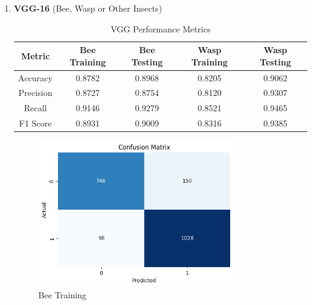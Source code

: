 \documentclass[12pt]{article}
\begin{document}
\begin{enumerate}
		\item \textbf{VGG-16} (Bee, Wasp or Other Insects) \\
		\begin{table}[H]
			\centering
			\caption{VGG Performance Metrics}
			\vspace{0.25 cm}
			\begin{tabular}{|c|c|c|c|c|}
				\hline
				\textbf{Metric} & \textbf{Bee Training} & \textbf{Bee Testing}  & \textbf{Wasp Training} & \textbf{Wasp Testing}\\
				\hline
				Accuracy & 0.8782  & 0.8968 & 0.8205  & 0.9062 \\ \hline
				Precision & 0.8727 & 0.8754  & 0.8120 & 0.9307\\ \hline
				Recall & 0.9146 & 0.9279  & 0.8521 & 0.9465 \\ \hline
				F1 Score & 0.8931 & 0.9009 & 0.8316 & 0.9385 \\ \hline
			\end{tabular}
			\label{tab:VGG_METRICS}
		\end{table}
		\begin{figure}[H]
			\centering
			\vspace{1 cm}
			\begin{minipage}{0.45\textwidth}
				\centering
				\includegraphics[width=0.8\textwidth]{Images/Confusion/vgg bees train.png}\\ \vspace{0.25 cm}
				Bee Training
			\end{minipage}
			\hfill
			\begin{minipage}{0.45\textwidth} 
				\centering           

\end{minipage}
\end{figure}
\end{enumerate}
\end{document}
